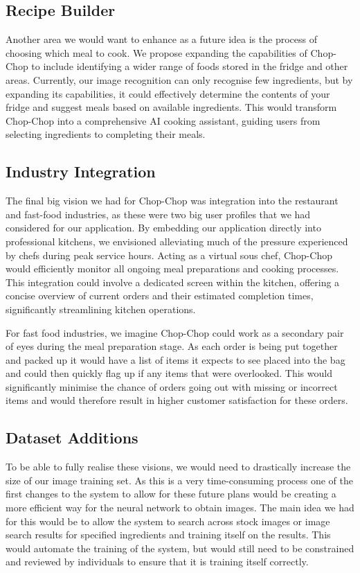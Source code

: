 \documentclass{article}
\begin{document}
\subsection{Recipe Builder}
Another area we would want to enhance as a future idea is the process of choosing which meal to cook. We propose expanding the capabilities of Chop-Chop to include identifying a wider range of foods stored in the fridge and other areas. Currently, our image recognition can only recognise few ingredients, but by expanding its capabilities, it could effectively determine the contents of your fridge and suggest meals based on available ingredients. This would transform Chop-Chop into a comprehensive AI cooking assistant, guiding users from selecting ingredients to completing their meals.
\subsection{Industry Integration}
The final big vision we had for Chop-Chop was integration into the restaurant and fast-food industries, as these were two big user profiles that we had considered for our application.
By embedding our application directly into professional kitchens, we envisioned alleviating much of the pressure experienced by chefs during peak service hours. Acting as a virtual sous chef, Chop-Chop would efficiently monitor all ongoing meal preparations and cooking processes. This integration could involve a dedicated screen within the kitchen, offering a concise overview of current orders and their estimated completion times, significantly streamlining kitchen operations.

For fast food industries, we imagine Chop-Chop could work as a secondary pair of eyes during the meal preparation stage. As each order is being put together and packed up it would have a list of items it expects to see placed into the bag and could then quickly flag up if any items that were overlooked. This would significantly minimise the chance of orders going out with missing or incorrect items and would therefore result in higher customer satisfaction for these orders.

\subsection{Dataset Additions}
To be able to fully realise these visions, we would need to drastically increase the size of our image training set. As this is a very time-consuming process one of the first changes to the system to allow for these future plans would be creating a more efficient way for the neural network to obtain images. The main idea we had for this would be to allow the system to search across stock images or image search results for specified ingredients and training itself on the results. This would automate the training of the system, but would still need to be constrained and reviewed by individuals to ensure that it is training itself correctly.
\end{document}
